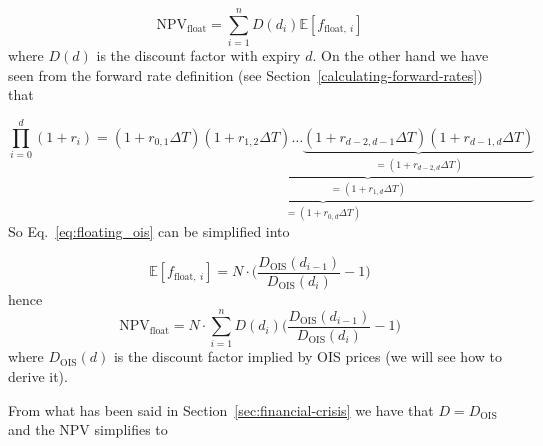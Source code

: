 \begin{equation}
\mathrm{NPV}_{\mathrm{float}} = \sum_{i=1}^{n}D(d_i)\mathbb{E}[f_{\mathrm{float},~i}]
\end{equation}
where \(D(d)\) is the discount factor with expiry \(d\). On the other hand we have seen from the forward rate definition (see Section~\ref{calculating-forward-rates}) that

\begin{equation*}
\prod_{i=0}^{d} (1+r_i) = \underbrace{(1+r_{0,1}\Delta T)\underbrace{(1+r_{1,2}\Delta T)\ldots\underbrace{(1+r_{d-2,d-1}\Delta T)(1+r_{d-1,d}\Delta T)}_{=(1+r_{d-2,d}\Delta T)}}_{=(1+r_{1,d}\Delta T)}}_{=(1+r_{0,d}\Delta T)}
\end{equation*}
So Eq.~\ref{eq:floating_ois} can be simplified into

\begin{equation}
\mathbb{E}[f_{\mathrm{float},~i}] = N\cdot\Big(\frac{D_{\mathrm{OIS}}(d_{i-1})}{D_{\mathrm{OIS}}(d_{i})} - 1\Big)
\end{equation}
hence
\begin{equation}
\mathrm{NPV}_{\mathrm{float}} = N\cdot \sum_{i=1}^{n}D(d_i) \Big(\frac{D_{\mathrm{OIS}}(d_{i-1})}{D_{\mathrm{OIS}}(d_{i})} - 1\Big)
\end{equation}
where \(D_{\mathrm{OIS}}(d)\) is the discount factor implied by OIS prices (we will see how to derive it).

%

From what has been said in Section~\ref{sec:financial-crisis} we have that \(D = D_{\mathrm{OIS}}\) and the NPV simplifies to

